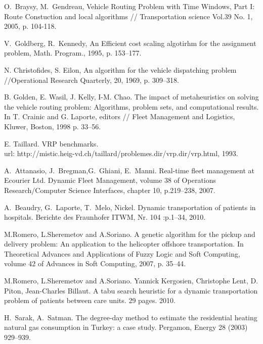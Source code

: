 \documentclass[]{TAACpaper}
\begin{document}
\begin{thebibliography}{99}
 O.~Braysy, M.~Gendreau, Vehicle Routing Problem with Time Windows, Part I: Route Constuction and local algorithms // Transportation science Vol.39 No. 1, 2005, p. 104-118.

 V.~Goldberg, R.~Kennedy, An Efficient cost scaling algotirhm for the assignment problem, Math. Program., 1995, p. 153--177.  

  N. Christofides, S. Eilon, An algorithm for the vehicle dispatching problem //Operational Research Quarterly, 20, 1969, p. 309–318.

  B. Golden, E. Wasil, J. Kelly, I-M. Chao. The impact of metaheuristics on solving the vehicle routing problem: Algorithms, problem sets, and computational results. In T. Crainic and G. Laporte, editors // Fleet Management and Logistics, Kluwer, Boston, 1998 p. 33–56.

  E. Taillard. VRP benchmarks.\\ url: http://mistic.heig-vd.ch/taillard/problemes.dir/vrp.dir/vrp.html, 1993.

 A.~Attanasio, J.~Bregman,G.~Ghiani, E.~Manni. Real-time fleet management at Ecourier Ltd. Dynamic Fleet Management, volume 38 of Operations Research/Computer Science Interfaces, chapter 10, p.219--238, 2007.

 A.~Beaudry, G.~Laporte, T.~Melo, Nickel. Dynamic transportation of patients in hospitals. Berichte des Fraunhofer ITWM, Nr. 104 :p.1--34, 2010.

 M.Romero, L.Sheremetov and A.Soriano. A genetic algorithm for the pickup and delivery problem: An application to the helicopter offshore transportation. In Theoretical Advances and Applications of Fuzzy Logic and Soft Computing, volume 42 of Advances in Soft Computing, 2007, p. 35--44.

 M.Romero, L.Sheremetov and A.Soriano. Yannick Kergosien, Christophe Lent, D. Piton, Jean-Charles Billaut. A tabu search heuristic for a dynamic transportation problem of patients between care units. 29 pages. 2010.

 H.~Sarak, A.~Satman. The degree-day method to estimate the residential heating natural gas consumption in Turkey: a case study. Pergamon, Energy 28 (2003) 929--939.




\end{thebibliography}
\end{document}
